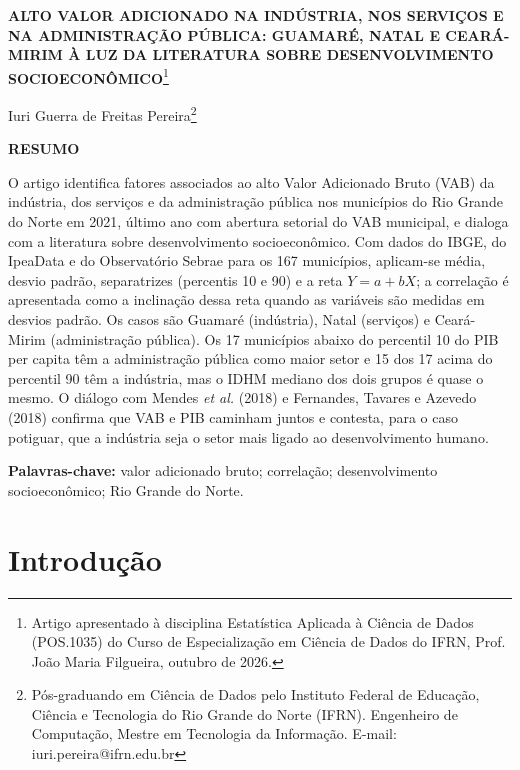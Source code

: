 \documentclass[12pt,a4paper]{article}
\begin{document}
\thispagestyle{empty}
\begin{singlespace}
\begin{center}
\textbf{ALTO VALOR ADICIONADO NA INDÚSTRIA, NOS SERVIÇOS E NA ADMINISTRAÇÃO PÚBLICA: GUAMARÉ, NATAL E CEARÁ-MIRIM À LUZ DA LITERATURA SOBRE DESENVOLVIMENTO SOCIOECONÔMICO}\footnote{Artigo apresentado à disciplina Estatística Aplicada à Ciência de Dados (POS.1035) do Curso de Especialização em Ciência de Dados do IFRN, Prof. João Maria Filgueira, outubro de 2026.}
\end{center}
\vspace{8pt}
\begin{flushright}
Iuri Guerra de Freitas Pereira\footnote{Pós-graduando em Ciência de Dados pelo Instituto Federal de Educação, Ciência e Tecnologia do Rio Grande do Norte (IFRN). Engenheiro de Computação, Mestre em Tecnologia da Informação. E-mail: iuri.pereira@ifrn.edu.br}
\end{flushright}
\vspace{8pt}
\noindent\textbf{RESUMO}

\noindent O artigo identifica fatores associados ao alto Valor Adicionado Bruto (VAB) da indústria, dos serviços e da administração pública nos municípios do Rio Grande do Norte em 2021, último ano com abertura setorial do VAB municipal, e dialoga com a literatura sobre desenvolvimento socioeconômico. Com dados do IBGE, do IpeaData e do Observatório Sebrae para os 167 municípios, aplicam-se média, desvio padrão, separatrizes (percentis 10 e 90) e a reta $Y = a + bX$; a correlação é apresentada como a inclinação dessa reta quando as variáveis são medidas em desvios padrão. Os casos são Guamaré (indústria), Natal (serviços) e Ceará-Mirim (administração pública). Os 17 municípios abaixo do percentil 10 do PIB per capita têm a administração pública como maior setor e 15 dos 17 acima do percentil 90 têm a indústria, mas o IDHM mediano dos dois grupos é quase o mesmo. O diálogo com Mendes \textit{et al.} (2018) e Fernandes, Tavares e Azevedo (2018) confirma que VAB e PIB caminham juntos e contesta, para o caso potiguar, que a indústria seja o setor mais ligado ao desenvolvimento humano.

\vspace{4pt}
\noindent\textbf{Palavras-chave:} valor adicionado bruto; correlação; desenvolvimento socioeconômico; Rio Grande do Norte.
\end{singlespace}

\vspace{6pt}
\section{Introdução}
\end{document}

